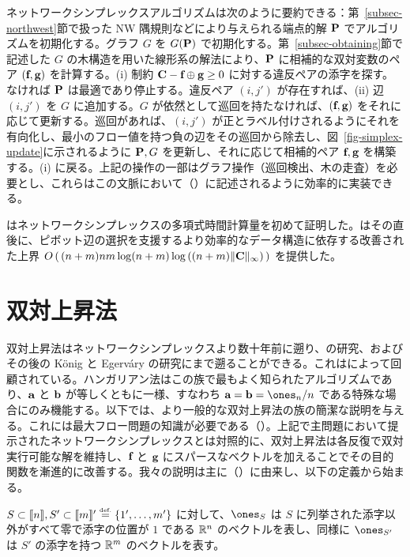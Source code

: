 ネットワークシンプレックスアルゴリズムは次のように要約できる：第~\ref{subsec-northwest}節で扱った NW 隅規則などにより与えられる端点的解 $\P$ でアルゴリズムを初期化する。グラフ $G$ を $G(\P)$ で初期化する。第~\ref{subsec-obtaining}節で記述した $G$ の木構造を用いた線形系の解法により、$\P$ に相補的な双対変数のペア $(\fD,\gD)$ を計算する。{(i)} 制約 $\C- \fD\oplus \gD\geq 0$ に対する違反ペアの添字を探す。なければ $\P$ は最適であり停止する。違反ペア $(i,j')$ が存在すれば、{(ii)} 辺 $(i,j')$ を $G$ に追加する。$G$ が依然として巡回を持たなければ、$(\fD,\gD)$ をそれに応じて更新する。巡回があれば、$(i,j')$ が正とラベル付けされるようにそれを有向化し、最小のフロー値を持つ負の辺をその巡回から除去し、図~\ref{fig-simplex-update}に示されるように $\P,G$ を更新し、それに応じて相補的ペア $\fD,\gD$ を構築する。{(i)} に戻る。上記の操作の一部はグラフ操作（巡回検出、木の走査）を必要とし、これらはこの文脈において（\cite[\S5]{bertsekas1998network}）に記述されるように効率的に実装できる。

\citet{Orlin1997}はネットワークシンプレックスの多項式時間計算量を初めて証明した。\citet{Tarjan1997}はその直後に、ピボット辺の選択を支援するより効率的なデータ構造に依存する改善された上界 $O\left(\,(n+m)nm \log(n+m)\log\left((n+m)\|\C\|_\infty\right)\,\right)$ を提供した。



\section{双対上昇法}\label{s-dual-ascent}

双対上昇法はネットワークシンプレックスより数十年前に遡り、\citet{borchardt1865investigando}の研究、およびその後の K\"onig と Egerv\'ary の研究にまで遡ることができる。これは\citet{Kuhn1955}によって回顧されている。ハンガリアン法はこの族で最もよく知られたアルゴリズムであり、$\a$ と $\b$ が等しくともに一様、すなわち $\a=\b=\ones_n/n$ である特殊な場合にのみ機能する。以下では、より一般的な双対上昇法の族の簡潔な説明を与える。これには最大フロー問題の知識が必要である（\cite[\S7.5]{bertsimas1997introduction}）。上記で主問題において提示されたネットワークシンプレックスとは対照的に、双対上昇法は各反復で双対実行可能な解を維持し、$\fD$ と $\gD$ にスパースなベクトルを加えることでその目的関数を漸進的に改善する。我々の説明は主に（\cite[\S7.7]{bertsimas1997introduction}）に由来し、以下の定義から始まる。

\begin{defn} $S\subset\range{n},S'\subset\range{m}'\eqdef \{1',\dots,m'\}$ に対して、$\ones_S$ は $S$ に列挙された添字以外がすべて零で添字の位置が $1$ である $\RR^n$ のベクトルを表し、同様に $\ones_{S'}$ は $S'$ の添字を持つ $\RR^m$ のベクトルを表す。
\end{defn}


